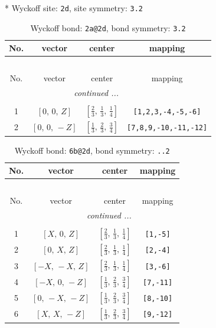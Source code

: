 \documentclass[fleqn,8pt]{jsarticle}
\begin{document}
* Wyckoff site: {\tt 2d}, site symmetry: {\tt 3.2}
\renewcommand{\arraystretch}{1.2}
\begin{longtable}{cccc}
\caption{Wyckoff bond: {\tt 2a@2d}, bond symmetry: {\tt 3.2}}
 \\
 \hline \hline
No. & vector & center & mapping \\ \hline \endfirsthead

\multicolumn{3}{l}{\tablename\ \thetable{}} \\
 \hline \hline
No. & vector & center & mapping \\ \hline \endhead

 \hline \hline
\multicolumn{3}{r}{\footnotesize\it continued ...} \\ \endfoot

 \hline \hline
\multicolumn{3}{r}{} \\ \endlastfoot

1 & $\left[ 0,\, 0,\, Z \right]$ & $\left[ \frac{2}{3},\, \frac{1}{3},\, \frac{1}{4} \right]$ & {\tt [1,2,3,-4,-5,-6]} \\ \hline
2 & $\left[ 0,\, 0,\, - Z \right]$ & $\left[ \frac{1}{3},\, \frac{2}{3},\, \frac{3}{4} \right]$ & {\tt [7,8,9,-10,-11,-12]} \\
\end{longtable}
\renewcommand{\arraystretch}{1.2}
\begin{longtable}{cccc}
\caption{Wyckoff bond: {\tt 6b@2d}, bond symmetry: {\tt ..2}}
 \\
 \hline \hline
No. & vector & center & mapping \\ \hline \endfirsthead

\multicolumn{3}{l}{\tablename\ \thetable{}} \\
 \hline \hline
No. & vector & center & mapping \\ \hline \endhead

 \hline \hline
\multicolumn{3}{r}{\footnotesize\it continued ...} \\ \endfoot

 \hline \hline
\multicolumn{3}{r}{} \\ \endlastfoot

1 & $\left[ X,\, 0,\, Z \right]$ & $\left[ \frac{2}{3},\, \frac{1}{3},\, \frac{1}{4} \right]$ & {\tt [1,-5]} \\ \hline
2 & $\left[ 0,\, X,\, Z \right]$ & $\left[ \frac{2}{3},\, \frac{1}{3},\, \frac{1}{4} \right]$ & {\tt [2,-4]} \\ \hline
3 & $\left[ - X,\, - X,\, Z \right]$ & $\left[ \frac{2}{3},\, \frac{1}{3},\, \frac{1}{4} \right]$ & {\tt [3,-6]} \\ \hline
4 & $\left[ - X,\, 0,\, - Z \right]$ & $\left[ \frac{1}{3},\, \frac{2}{3},\, \frac{3}{4} \right]$ & {\tt [7,-11]} \\ \hline
5 & $\left[ 0,\, - X,\, - Z \right]$ & $\left[ \frac{1}{3},\, \frac{2}{3},\, \frac{3}{4} \right]$ & {\tt [8,-10]} \\ \hline
6 & $\left[ X,\, X,\, - Z \right]$ & $\left[ \frac{1}{3},\, \frac{2}{3},\, \frac{3}{4} \right]$ & {\tt [9,-12]} \\
\end{longtable}
\end{document}

